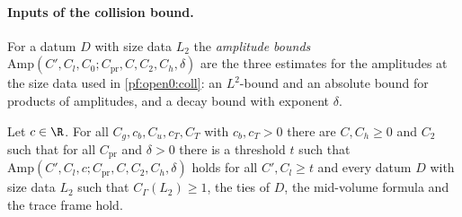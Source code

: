 \paragraph{Inputs of the collision bound.}
For a datum $D$ with size data $L_2$ the \emph{amplitude bounds} $\mathrm{Amp}(C',C_l,C_0;C_{\mathrm{pr}},C,C_2,C_h,\delta)$ are the three
estimates for the amplitudes at the size data used in \cref{pf:open0:coll}: an $L^2$-bound and an absolute bound for products of
amplitudes, and a decay bound with exponent $\delta$.

\begin{proposition}\label{pf:open0:ampon}
Let $c\in\R$. For all $C_g,c_b,C_u,c_T,C_T$ with $c_b,c_T>0$ there are $C,C_h\ge0$ and $C_2$ such that for all $C_{\mathrm{pr}}$ and
$\delta>0$ there is a threshold $t$ such that $\mathrm{Amp}(C',C_l,c;C_{\mathrm{pr}},C,C_2,C_h,\delta)$ holds for all $C',C_l\ge t$ and every
datum $D$ with size data $L_2$ such that $C_\Gamma(L_2)\ge1$, the ties of $D$, the mid-volume formula and the trace frame hold.
\ \
\end{proposition}

